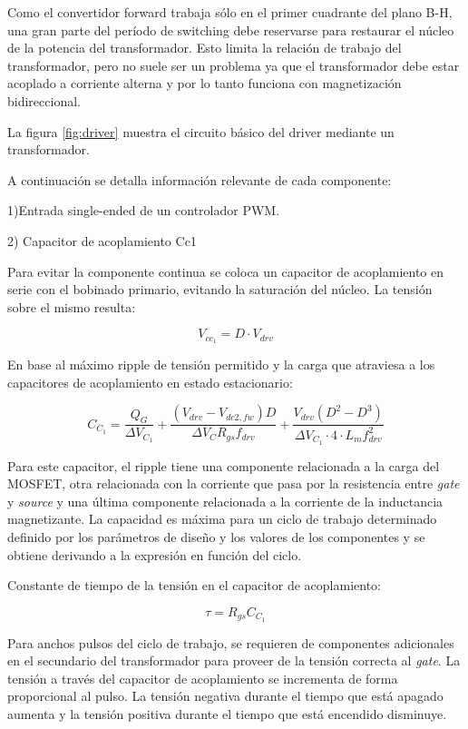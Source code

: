 Como el convertidor forward trabaja sólo en el primer cuadrante del plano B-H, una gran parte del período de switching debe reservarse para restaurar el núcleo de la potencia del transformador. 
Esto limita la relación de trabajo del transformador, pero no suele ser un problema ya que 
el transformador debe estar acoplado a corriente alterna y por lo tanto funciona con magnetización bidireccional. 

La figura \ref{fig:driver} muestra el circuito básico del driver mediante un transformador.

A continuación se detalla información relevante de cada componente: 

1)Entrada single-ended de un controlador PWM.

2) Capacitor de acoplamiento Cc1

Para evitar la componente continua se coloca un capacitor de acoplamiento en serie con el bobinado primario, 
evitando la saturación del núcleo. La tensión sobre el mismo resulta: 

$$ V_{cc_1}=D\cdot V_{drv} $$

En base al máximo ripple de tensión permitido y la carga que atraviesa a los capacitores de acoplamiento en estado estacionario:

$$ C_{C_1}=\frac{Q_G}{\Delta V_{C_1}}+\frac{(V_{drv}-V_{dc2,fw})D}{\Delta V_CR_{gs}f_{drv}}+\frac{V_{drv}(D^2-D^3)}{\Delta V_{C_1}\cdot4\cdot L_mf_{drv}^2} $$

Para este capacitor, el ripple tiene una componente relacionada a la carga del MOSFET, 
otra relacionada con la corriente que pasa por la resistencia entre \textit{gate} y \textit{source} 
y una última componente relacionada a la corriente de la inductancia magnetizante. 
La capacidad es máxima para un ciclo de trabajo determinado definido por los parámetros de diseño 
y los valores de los componentes y se obtiene derivando a la expresión en función del ciclo. 

Constante de tiempo de la tensión en el capacitor de acoplamiento:

$$ \tau=R_{gs}C_{C_1} $$

Para anchos pulsos del ciclo de trabajo, se requieren de componentes adicionales 
en el secundario del transformador para proveer de la tensión correcta al \textit{gate}. 
La tensión a través del capacitor de acoplamiento se incrementa de forma proporcional al pulso. 
La tensión negativa durante el tiempo que está apagado aumenta y la tensión positiva durante el tiempo que está encendido disminuye. 

